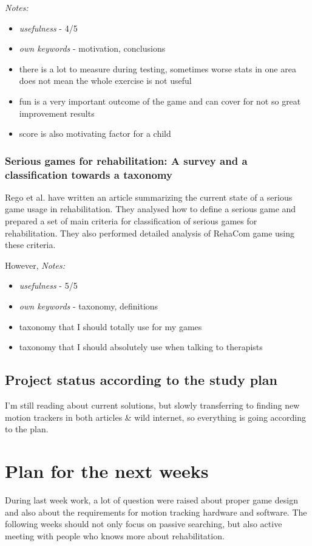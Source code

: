 \documentclass[10pt,a4paper]{article}
\begin{document}
\emph{Notes:}
\begin{itemize}
\item \emph{usefulness} - 4/5
\item \emph{own keywords} - motivation, conclusions
\item there is a lot to measure during testing, sometimes worse stats in one area does not mean the whole exercise is not useful
\item fun is a very important outcome of the game and can cover for not so great improvement results
\item score is also motivating factor for a child
\end{itemize} 

\subsubsection*{Serious games for rehabilitation: A survey and a classification towards a taxonomy}

Rego et al. \cite{rehabilitation} have written an article summarizing the current state of a serious game usage in rehabilitation. They analysed how to define a serious game and prepared a set of main criteria for classification of serious games for rehabilitation. They also performed detailed analysis of RehaCom game using these criteria.

However, 
\emph{Notes:}
\begin{itemize}
\item \emph{usefulness} - 5/5
\item \emph{own keywords} - taxonomy, definitions
\item taxonomy that I should totally use for my games
\item taxonomy that I should absolutely use when talking to therapists
\end{itemize} 
\subsection*{Project status according to the study plan}
I'm still reading about current solutions, but slowly transferring to finding new motion trackers in both articles \& wild internet, so everything is going according to the plan. 

\section*{Plan for the next weeks}
During last week work, a lot of question were raised about proper game design and also about the requirements for motion tracking hardware and software. The following weeks should not only focus on passive searching, but also active meeting with people who knows more about rehabilitation. 

 

\end{document}
